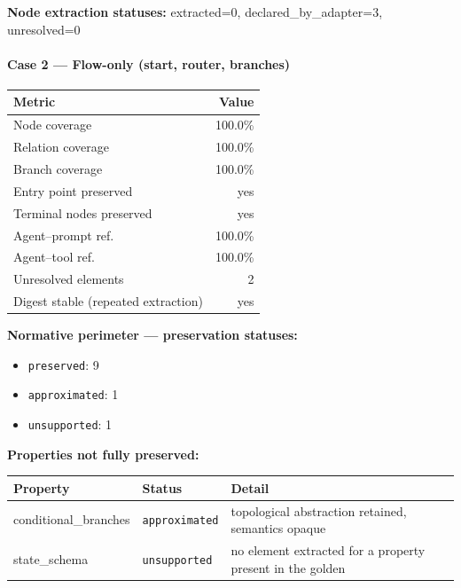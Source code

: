 \documentclass[10pt]{article}
\newcommand{\statuspreserved}{\textcolor{preservedgreen}{\texttt{preserved}}}
\newcommand{\statusapproximated}{\textcolor{approximatedorange}{\texttt{approximated}}}
\newcommand{\statusunsupported}{\textcolor{unsupportedgray}{\texttt{unsupported}}}
\begin{document}
\textbf{Node extraction statuses:} extracted=0, declared\_by\_adapter=3, unresolved=0

\paragraph{Case 2 --- Flow-only (start, router, branches)}

\begin{table}[htbp]
	\centering
	\begin{tabular}{@{}lr@{}}
		\toprule
		\textbf{Metric} & \textbf{Value} \\
		\midrule
		Node coverage & 100.0\% \\
		Relation coverage & 100.0\% \\
		Branch coverage & 100.0\% \\
		Entry point preserved & yes \\
		Terminal nodes preserved & yes \\
		Agent--prompt ref. & 100.0\% \\
		Agent--tool ref. & 100.0\% \\
		Unresolved elements & 2 \\
		Digest stable (repeated extraction) & yes \\
		\bottomrule
	\end{tabular}
\end{table}

\textbf{Normative perimeter --- preservation statuses:}
\begin{itemize}[nosep]
	\item \statuspreserved{}: 9
	\item \statusapproximated{}: 1
	\item \statusunsupported{}: 1
\end{itemize}

\textbf{Properties not fully preserved:}

\begin{table}[htbp]
	\centering
	\small
	\begin{tabular}{@{}llp{8cm}@{}}
		\toprule
		\textbf{Property} & \textbf{Status} & \textbf{Detail} \\
		\midrule
		conditional\_branches & \statusapproximated{} & topological abstraction retained, semantics opaque \\
		state\_schema & \statusunsupported{} & no element extracted for a property present in the golden \\
		\bottomrule
	\end{tabular}
\end{table}
\end{document}
